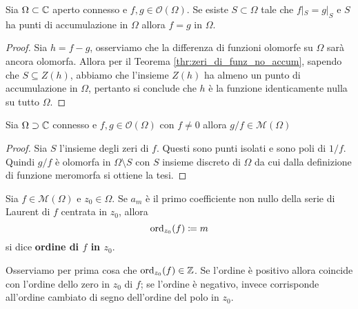 \begin{corollary}
    \label{cor:principio_indentita}
  Sia $\Omega \subset \mathbb{C}$ aperto connesso e $f,g \in \mathcal{O}(\Omega)$. Se
  esiste $S \subset \Omega$ tale che $f|_S = g|_S$ e $S$ ha punti di
  accumulazione in $\Omega$ allora $f = g$ in $\Omega$.
\end{corollary}
\begin{proof}
  Sia $h = f - g$, osserviamo che la differenza di funzioni olomorfe su $\Omega$
  sarà ancora olomorfa. Allora per il Teorema \ref{thr:zeri_di_funz_no_accum},
  sapendo che $S \subseteq Z(h)$, abbiamo che l'insieme $Z(h)$ ha almeno
  un punto di accumulazione in $\Omega$, pertanto si
  conclude che $h$ è la funzione identicamente nulla su tutto $\Omega$.
\end{proof}

\begin{corollary}
	\label{thr:rapporto_olomorfe_diventa_meromorfa}
  Sia $\Omega \supset \mathbb{C}$ connesso e $f,g \in \mathcal{O}(\Omega)$ con $f \neq
  0$ allora $g / f \in \mathcal{M}(\Omega)$ 
\end{corollary}
\begin{proof}
  Sia $S$ l'insieme degli zeri di $f$. Questi sono punti isolati e sono poli 
  di $1/f$. Quindi $g/f$ è olomorfa in $\Omega \setminus S$ con $S$ insieme 
  discreto di $\Omega$ da cui dalla definizione di funzione meromorfa si 
  ottiene la tesi.
\end{proof}

\begin{definition}
\label{def:ordine_funz_meromorfa}
  Sia $f\in \mathcal{M}(\Omega)$ e $z_0 \in \Omega$. Se $a_m$ è il primo
  coefficiente non nullo della serie di Laurent di $f$ centrata in $z_0$, allora 
  \begin{equation*}
    \operatorname{ord}_{z_0} (f)  \coloneqq m
  \end{equation*}
  si dice \textbf{ordine di $f$ in $z_0$}.
\end{definition}

\begin{remark}
  Osserviamo per prima cosa che $\operatorname{ord}_{z_0}(f) \in \mathbb{Z}$. Se l'ordine è positivo
  allora coincide con l'ordine dello zero in $z_0$ di $f$; se l'ordine
  è negativo, invece corrisponde all'ordine cambiato di segno dell'ordine del
  polo in $z_0$.  
  \label{rmk:insight_ordine}
\end{remark}

